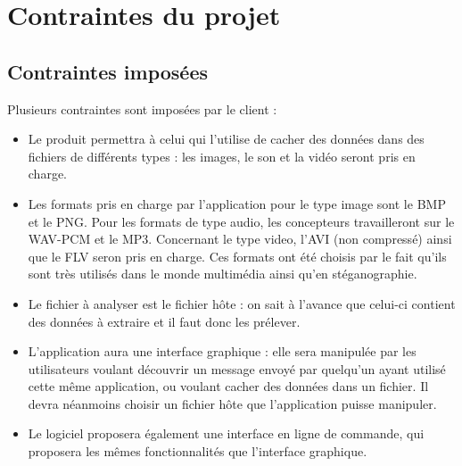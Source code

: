 \documentclass[11pt]{article}
\begin{document}
\section{Contraintes du projet}





\subsection{Contraintes imposées}

Plusieurs contraintes sont imposées par le client : 

\begin{itemize}
\item Le produit permettra à celui qui l'utilise de cacher des données dans des
    fichiers de différents types : les images, le son et la vidéo seront pris
    en charge. 
\item Les formats pris en charge par l'application pour le type image sont 
le BMP et le PNG. Pour les formats de type audio, les concepteurs travailleront sur 
le WAV-PCM et le MP3. Concernant le type video, l'AVI (non compressé) ainsi 
que le FLV seron pris en charge. \newline
Ces formats ont été choisis par le fait qu'ils sont très utilisés dans le
monde multimédia ainsi qu'en stéganographie. 

\item Le fichier à analyser est le fichier hôte : on sait à l'avance que celui-ci
    contient des données à extraire et il faut donc les prélever. 
\item L'application aura une interface graphique : elle sera manipulée par les
    utilisateurs voulant découvrir un message envoyé par quelqu'un ayant
    utilisé cette même application, ou voulant cacher des données dans un
    fichier. Il devra néanmoins choisir un fichier hôte que l'application
    puisse manipuler. 
\item Le logiciel proposera également une interface en ligne de commande, qui
    proposera les mêmes fonctionnalités que l'interface graphique. 
\end{itemize}
\end{document}
